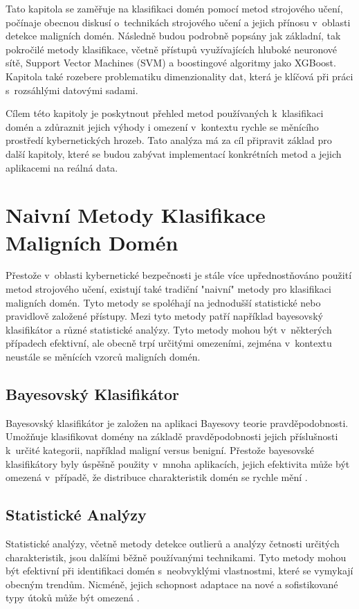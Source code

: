 Tato kapitola se zaměřuje na klasifikaci domén pomocí metod strojového učení, počínaje obecnou diskusí o~technikách strojového učení a jejich přínosu v~oblasti detekce maligních domén. Následně budou podrobně popsány jak základní, tak pokročilé metody klasifikace, včetně přístupů využívajících hluboké neuronové sítě, Support Vector Machines (SVM) a boostingové algoritmy jako XGBoost. Kapitola také rozebere problematiku dimenzionality dat, která je klíčová při práci s~rozsáhlými datovými sadami.

Cílem této kapitoly je poskytnout přehled metod používaných k~klasifikaci domén a zdůraznit jejich výhody i omezení v~kontextu rychle se měnícího prostředí kybernetických hrozeb. Tato analýza má za cíl připravit základ pro další kapitoly, které se budou zabývat implementací konkrétních metod a jejich aplikacemi na reálná data.


\section{Naivní Metody Klasifikace Maligních Domén}

Přestože v~oblasti kybernetické bezpečnosti je stále více upřednostňováno použití metod strojového učení, existují také tradiční "naivní" metody pro klasifikaci maligních domén. Tyto metody se spoléhají na jednodušší statistické nebo pravidlově založené přístupy. Mezi tyto metody patří například bayesovský klasifikátor a různé statistické analýzy. Tyto metody mohou být v~některých případech efektivní, ale obecně trpí určitými omezeními, zejména v~kontextu neustále se měnících vzorců maligních domén.

\subsection{Bayesovský Klasifikátor}
Bayesovský klasifikátor je založen na aplikaci Bayesovy teorie pravděpodobnosti. Umožňuje klasifikovat domény na základě pravděpodobnosti jejich příslušnosti k~určité kategorii, například maligní versus benigní. Přestože bayesovské klasifikátory byly úspěšně použity v~mnoha aplikacích, jejich efektivita může být omezená v~případě, že distribuce charakteristik domén se rychle mění \cite{mcdowell2004bayesian}.

\subsection{Statistické Analýzy}
Statistické analýzy, včetně metody detekce outlierů a analýzy četnosti určitých charakteristik, jsou dalšími běžně používanými technikami. Tyto metody mohou být efektivní při identifikaci domén s~neobvyklými vlastnostmi, které se vymykají obecným trendům. Nicméně, jejich schopnost adaptace na nové a sofistikované typy útoků může být omezená \cite{antonakakis2010building}.

